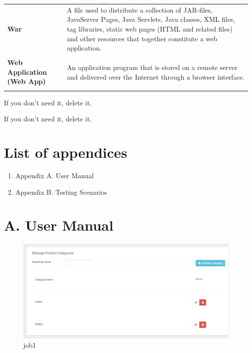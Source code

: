 \documentclass[a4paper,11pt,twoside]{report}
\theoremstyle{definition}
\begin{document}
\begin{longtable}{p{4cm} p{11cm}}
\textbf{War } & A file used to distribute a collection of JAR-files, JavaServer Pages, Java Servlets, Java classes, XML files, tag libraries, static web pages (HTML and related files) and other resources that together constitute a web application. \\ \\
\textbf{Web Application (Web App)} & An application program that is stored on a remote server and delivered over the Internet through a browser interface.\\ \\


\end{longtable}

\thispagestyle{empty}


\listoffigures
\thispagestyle{empty}
If you don't need it, delete it.


\renewcommand{\listtablename}{List of tables}
\listoftables
\thispagestyle{empty}
If you don't need it, delete it.

\chapter*{List of appendices}
\begin{enumerate}
\item Appendix A. User Manual
\item Appendix B. Testing Scenarios
\end{enumerate}
\thispagestyle{empty}


\chapter*{A. User Manual}

\begin{figure}[h!]
\begin{center}
\includegraphics[width=\textwidth]{AS/categories/product/1}
\end{center}
\caption{job1}
\end{figure}
\end{document}

